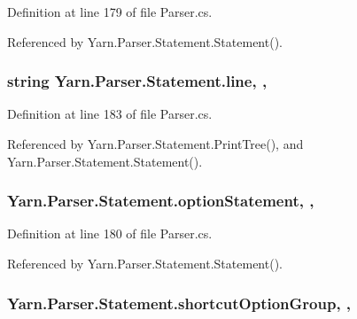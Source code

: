 Definition at line 179 of file Parser.\-cs.



Referenced by Yarn.\-Parser.\-Statement.\-Statement().

\hypertarget{a00156_a37695c7b00776bb292fd64894a70fb72}{
\subsubsection[{line}]{\setlength{\rightskip}{0pt plus 5cm}string Yarn.\-Parser.\-Statement.\-line\hspace{0.3cm}{\ttfamily [get]}, {\ttfamily [set]}, {\ttfamily [package]}}}\label{a00156_a37695c7b00776bb292fd64894a70fb72}


Definition at line 183 of file Parser.\-cs.



Referenced by Yarn.\-Parser.\-Statement.\-Print\-Tree(), and Yarn.\-Parser.\-Statement.\-Statement().

\hypertarget{a00156_a15020b7dab4983adbd185d5c2c2ebe84}{
\subsubsection[{option\-Statement}]{ Yarn.\-Parser.\-Statement.\-option\-Statement\hspace{0.3cm}{\ttfamily [get]}, {\ttfamily [set]}, {\ttfamily [package]}}}\label{a00156_a15020b7dab4983adbd185d5c2c2ebe84}


Definition at line 180 of file Parser.\-cs.



Referenced by Yarn.\-Parser.\-Statement.\-Statement().

\hypertarget{a00156_a54d73ad69c4af4a0d61edeaea4c8ca4f}{
\subsubsection[{shortcut\-Option\-Group}]{ Yarn.\-Parser.\-Statement.\-shortcut\-Option\-Group\hspace{0.3cm}{\ttfamily [get]}, {\ttfamily [set]}, {\ttfamily [package]}}}\label{a00156_a54d73ad69c4af4a0d61edeaea4c8ca4f}


